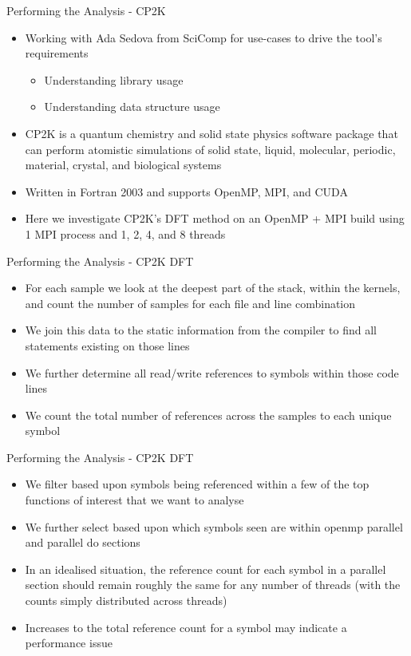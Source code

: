 \documentclass[final]{beamer}
\let\olditem\item
\renewcommand{\item}{\vspace{\fill}\olditem}
\begin{document}
\begin{frame}{\hspace{0.02\paperwidth}Performing the Analysis - CP2K}
\begin{itemize}
\item Working with Ada Sedova from SciComp for use-cases to drive the tool's requirements
\begin{itemize}
\item Understanding library usage
\item Understanding data structure usage
\end{itemize}
\item CP2K is a quantum chemistry and solid state physics software package that can perform atomistic simulations of solid state, liquid, molecular, periodic, material, crystal, and biological systems
\item Written in Fortran 2003 and supports OpenMP, \acs{MPI}, and CUDA
\item Here we investigate CP2K's \ac{DFT} method on an OpenMP + \acs{MPI} build using 1 \acs{MPI} process and 1, 2, 4, and 8 threads
\end{itemize}
\end{frame}

\begin{frame}{\hspace{0.02\paperwidth}Performing the Analysis - CP2K DFT}
\begin{itemize}
\item For each sample we look at the deepest part of the stack, within the kernels, and count the number of samples for each file and line combination
\item We join this data to the static information from the compiler to find all statements existing on those lines
\item We further determine all read/write references to symbols within those code lines
\item We count the total number of references across the samples to each unique symbol
\end{itemize}
\end{frame}

\begin{frame}{\hspace{0.02\paperwidth}Performing the Analysis - CP2K DFT}
\begin{itemize}
\item We filter based upon symbols being referenced within a few of the top functions of interest that we want to analyse
\item We further select based upon which symbols seen are within openmp parallel and parallel do sections
\item In an idealised situation, the reference count for each symbol in a parallel section should remain roughly the same for any number of threads (with the counts simply distributed across threads)
\item Increases to the total reference count for a symbol may indicate a performance issue
\end{itemize}
\end{frame}
\end{document}
